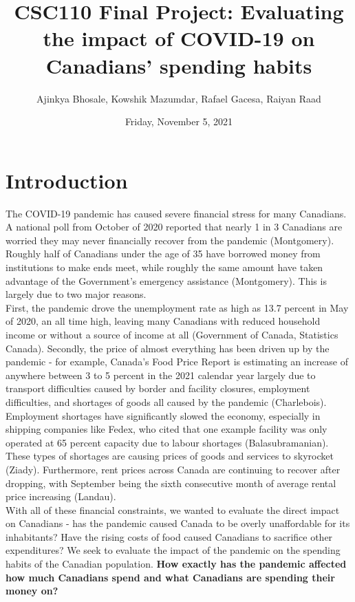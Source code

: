 \documentclass[fontsize=11pt]{article}
\title{CSC110 Final Project: Evaluating the impact of COVID-19 on Canadians’ spending habits}
\author{Ajinkya Bhosale, Kowshik Mazumdar, Rafael Gacesa, Raiyan Raad}
\date{Friday, November 5, 2021}
\begin{document}
\maketitle

\section*{Introduction}
\tab The COVID-19 pandemic has caused severe financial stress for many Canadians. A national poll from October of 2020 reported that nearly 1 in 3 Canadians are worried they may never financially recover from the pandemic (Montgomery). Roughly half of Canadians under the age of 35 have borrowed money from institutions to make ends meet, while roughly the same amount have taken advantage of the Government’s emergency assistance (Montgomery). This is largely due to two major reasons.\\

\tab First, the pandemic drove the unemployment rate as high as 13.7 percent in May of 2020, an all time high, leaving many Canadians with reduced household income or without a source of income at all (Government of Canada, Statistics Canada). Secondly, the price of almost everything has been driven up by the pandemic - for example, Canada’s Food Price Report is estimating an increase of anywhere between 3 to 5 percent in the 2021 calendar year largely due to transport difficulties caused by border and facility closures, employment difficulties, and shortages of goods all caused by the pandemic (Charlebois).\\

\tab Employment shortages have significantly slowed the economy, especially in shipping companies like Fedex, who cited that one example facility was only operated at 65 percent capacity due to labour shortages (Balasubramanian). These types of shortages are causing prices of goods and services to skyrocket (Ziady). Furthermore, rent prices across Canada are continuing to recover after dropping, with September being the sixth consecutive month of average rental price increasing (Landau).\\ 

\tab With all of these financial constraints, we wanted to evaluate the direct impact on Canadians - has the pandemic caused Canada to be overly unaffordable for its inhabitants? Have the rising costs of food caused Canadians to sacrifice other expenditures? We seek to evaluate the impact of the pandemic on the spending habits of the Canadian population. \textbf{How exactly has the pandemic affected how much Canadians spend and what Canadians are spending their money on?}
\end{document}
